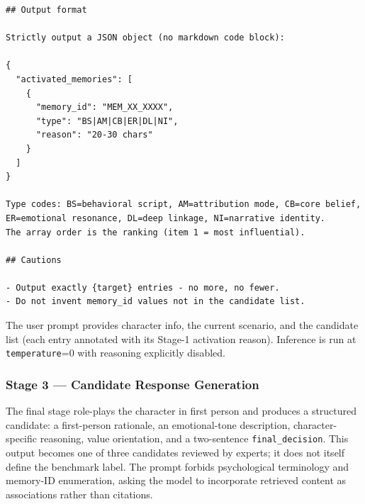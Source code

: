 \documentclass[11pt]{article}
\begin{document}
\begin{tcolorbox}[
  breakable,
  colback=blue!5,
  colframe=blue!60!black,
  title={\textbf{Stage 2 --- Activated-Memory Refinement Prompt}},
  fonttitle=\bfseries,
  rounded corners,
  boxrule=1.0pt
]
\begin{Verbatim}[fontsize=\scriptsize, breaklines=true, breaksymbolleft={}, breaksymbolright={}, breakindent=1em]
## Output format

Strictly output a JSON object (no markdown code block):

{
  "activated_memories": [
    {
      "memory_id": "MEM_XX_XXXX",
      "type": "BS|AM|CB|ER|DL|NI",
      "reason": "20-30 chars"
    }
  ]
}

Type codes: BS=behavioral script, AM=attribution mode, CB=core belief, ER=emotional resonance, DL=deep linkage, NI=narrative identity.
The array order is the ranking (item 1 = most influential).

## Cautions

- Output exactly {target} entries - no more, no fewer.
- Do not invent memory_id values not in the candidate list.
\end{Verbatim}
\end{tcolorbox}

The user prompt provides character info, the current scenario, and the candidate list (each entry annotated with its Stage-1 activation reason). Inference is run at \texttt{temperature}=0 with reasoning explicitly disabled.

\subsubsection{Stage 3 --- Candidate Response Generation}
\label{app:prompt_gt}

The final stage role-plays the character in first person and produces a structured candidate: a first-person rationale, an emotional-tone description, character-specific reasoning, value orientation, and a two-sentence \texttt{final\_decision}. This output becomes one of three candidates reviewed by experts; it does not itself define the benchmark label. The prompt forbids psychological terminology and memory-ID enumeration, asking the model to incorporate retrieved content as associations rather than citations.
\end{document}
